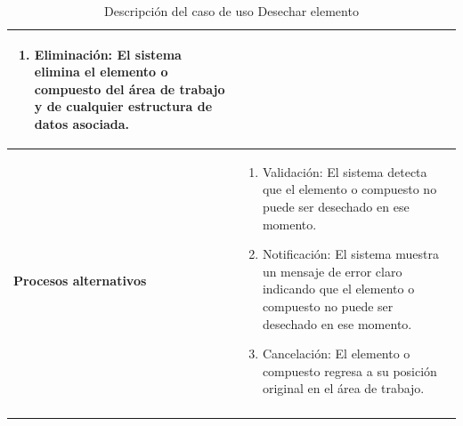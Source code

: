 \begin{longtable}{>{\raggedright\arraybackslash}m{} >{\raggedright\arraybackslash}m{}}
\begin{enumerate}
        \item \textbf{Eliminación:} El sistema elimina el elemento o compuesto del área de trabajo y de cualquier estructura de datos asociada.
    \end{enumerate} \\
    \midrule
    \textbf{Procesos alternativos} & 
    \begin{enumerate}[{4}A. ]
        \item Validación: El sistema detecta que el elemento o compuesto no puede ser desechado en ese momento.
        \item Notificación: El sistema muestra un mensaje de error claro indicando que el elemento o compuesto no puede ser desechado en ese momento.
        \item Cancelación: El elemento o compuesto regresa a su posición original en el área de trabajo.
    \end{enumerate}\\
    \midrule
    \caption{Descripción del caso de uso Desechar elemento}
    \label{tab:Caso_de_uso_ Balancear_Desechar_elemento}
\end{longtable}

